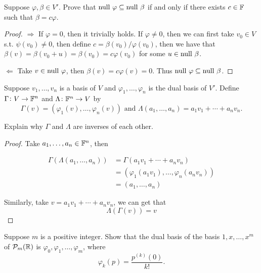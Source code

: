 \documentclass{extarticle}
\begin{document}
\begin{problem}{6}
    Suppose \(\varphi, \beta \in V'\). Prove that \(\text{null } \varphi \subseteq \text{null } \beta\) 
    if and only if there exists \(c \in \mathbb{F}\) such that \(\beta = c \varphi\). 
\end{problem}

\begin{proof}
\(\Rightarrow\) If \(\varphi = 0\), then it trivially holds. If \(\varphi \neq 0 \), then 
we can first take \(v_0 \in V\) s.t. \(\psi(v_0) \neq 0 \), then define \(c = \beta(v_0) / \varphi(v_0)\), 
then we have that \(\beta(v) = \beta(v_0 + u) = \beta(v_0) = c \varphi(v_0)\) for some \(u \in \text{null } \beta\). 

\(\Leftarrow\) Take \(v \in \text{null } \varphi\), then \(\beta(v) = c \varphi(v) = 0\). Thus 
\(\text{null } \varphi \subseteq \text{null } \beta\). 
\end{proof}

\begin{problem}{8}
    Suppose \(v_1, \ldots, v_n\) is a basis of \(V\) and \(\varphi_1, \ldots, \varphi_n\) is 
    the dual basis of \(V'\). Define \(\Gamma \colon V \to \mathbb{F}^n\) and \(\Lambda \colon 
    \mathbb{F}^n \to V\) by 
    \[\Gamma (v) = ( \varphi_1(v), \ldots, \varphi_n(v) ) \text{  and  } \Lambda(a_1, 
    \ldots, a_n) = a_1 v_1 + \cdots + a_n v_n.\]

    Explain why \(\Gamma\) and \(\Lambda\) are inverses of each other. 
\end{problem}

\begin{proof}
Take \(a_1, \ldots, a_n \in \mathbb{F}^n\), then 

\begin{align*}
    \Gamma(\Lambda(a_1, \ldots, a_n)) 
    &= \Gamma(a_1 v_1 + \cdots + a_n v_n)    \\ 
    &= (\varphi_1(a_1 v_1), \ldots, \varphi_n(a_n v_n)) \\ 
    &= (a_1, \ldots, a_n)
\end{align*}

Similarly, take \(v = a_1 v_1 + \cdots + a_n v_n\), we can get that 
\[\Lambda(\Gamma(v)) = v\]
\end{proof}

\begin{problem}{9}
    Suppose \(m\) is a positive integer. Show that the dual basis of the basis 
    \(1, x, \ldots, x^m\) of \(\mathcal{P}_m(\mathbb{R})\) is \(\varphi_0, \varphi_1, \ldots, \varphi_m\), where 
    \[\varphi_k(p) = \frac{p^{(k)}(0)}{k!}.\]
\end{problem}
\end{document}
